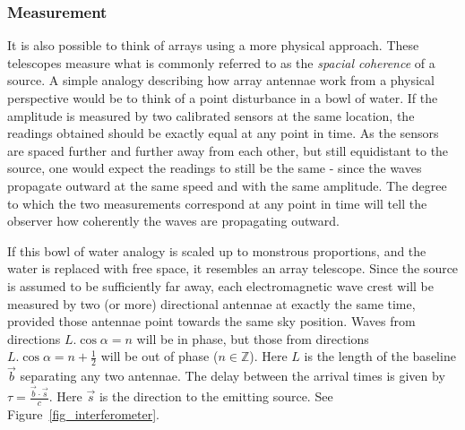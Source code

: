 \documentclass[a4paper,10pt]{report}
\begin{document}
\subsubsection{Measurement}
It is also possible to think of arrays using a more physical approach. These telescopes measure what is commonly referred 
to as the \textit{spacial coherence} of a source. A simple analogy describing how array antennae work from a physical 
perspective would be to think of a point disturbance in a bowl of water. If the amplitude is measured by two calibrated 
sensors at the same location, the readings obtained should be exactly equal at any point in time. As the sensors are 
spaced further and further away from each other, but still equidistant to the source, one would expect the readings to still
be the same - since the waves propagate outward at the same speed and with the same amplitude. The degree to which
the two measurements correspond at any point in time will tell the observer how coherently the waves are propagating outward.

If this bowl of water analogy is scaled up to monstrous proportions, and the water is replaced with free space, it 
resembles an array telescope. Since the source is assumed to be sufficiently far away, each electromagnetic wave crest 
will be measured by two (or more) directional antennae at exactly the same time, provided those antennae point
towards the same sky position. Waves from directions $L.\cos{\alpha}=n$ will be in phase, but those from
directions $L.\cos{\alpha} = n + \frac{1}{2}$ will be out of phase ($n\in\mathbb{Z}$). Here $L$ is the length of the 
baseline $\vec{b}$ separating any two antennae. The delay between the arrival times is given 
by $\tau=\frac{\vec{b}\cdot\vec{s}}{c}$. Here $\vec{s}$ is the direction to the emitting source. See 
Figure~\ref{fig_interferometer}.
\end{document}
